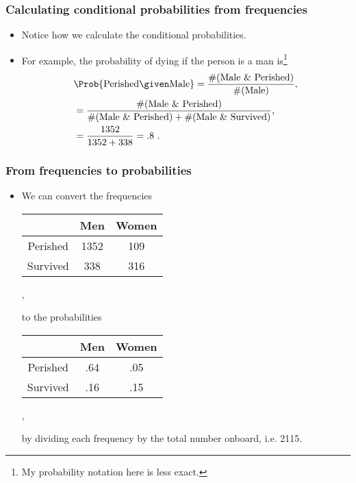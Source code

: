 \documentclass[10pt,xcolor=dvipsnames,serif,professionalfont]{beamer} %
\begin{document}
\begin{frame}
\frametitle{Calculating conditional probabilities from frequencies}
\begin{itemize}
\item Notice how we calculate the conditional probabilities.
\item For example, the probability of dying if the person is a man is\footnote{My probability notation here is less exact.} 
\begin{align}
&\Prob{\textrm{Perished} \given \textrm{Male}} = \frac{\#(\textrm{Male \& Perished})}{\#(\textrm{Male})},\\
&= \frac{\#(\textrm{Male \& Perished})}{\#(\textrm{Male \& Perished}) + \#(\textrm{Male \& Survived})},\\
&= \frac{1352}{1352+338} = .8\ .
\end{align}
\end{itemize}
\end{frame}

\begin{frame}
\frametitle{From frequencies to probabilities}
\begin{itemize}
\item We can convert the frequencies 
\begin{center}
\begin{tabular}{c|cc}
& Men & Women \\\hline
Perished & 1352 & 109 \\
Survived & 338 & 316 \\
\end{tabular},
\end{center}
to the probabilities 
\begin{center}
\begin{tabular}{c|cc}
& Men & Women \\\hline
Perished & .64 & .05 \\
Survived & .16 & .15 \\
\end{tabular},
\end{center}
by dividing each frequency by the total number onboard, i.e. 2115.
\end{itemize}
\end{frame}
\end{document}
